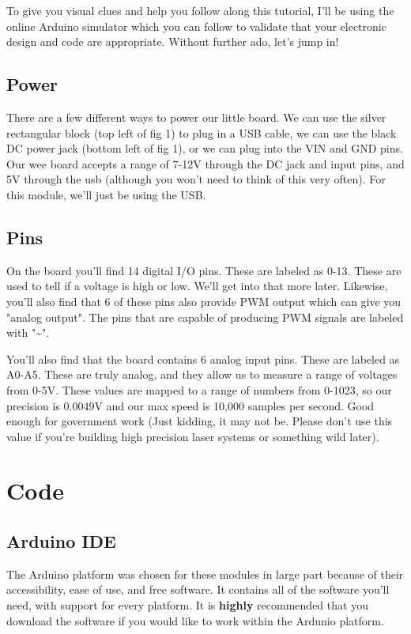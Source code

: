 \documentclass[a4paper]{article}
\begin{document}
To give you visual clues and help you follow along this tutorial, I'll be using the online Arduino simulator \cite{tinkercad} which you can follow to validate that your electronic design and code are appropriate. Without further ado, let's jump in!

\subsection{Power}
There are a few different ways to power our little board. We can use the silver rectangular block (top left of fig 1) to plug in a USB cable, we can use the black DC power jack (bottom left of fig 1), or we can plug into the VIN and GND pins. Our wee board accepts a range of 7-12V through the DC jack and input pins, and 5V through the usb (although you won't need to think of this very often). For this module, we'll just be using the USB.

\subsection{Pins}
On the board you'll find 14 digital I/O \cite{gpio} pins. These are labeled as 0-13. These are used to tell if a voltage is high or low. We'll get into that more later. Likewise, you'll also find that 6 of these pins also provide PWM \cite{pwm} output which can give you "analog output". The pins that are capable of producing PWM signals are labeled with "\~{}".

You'll also find that the board contains 6 analog input pins. These are labeled as A0-A5. These are truly analog, and they allow us to measure a range of voltages from 0-5V. These values are mapped to a range of numbers from 0-1023, so our precision is 0.0049V and our max speed is 10,000 samples per second. Good enough for government work (Just kidding, it may not be. Please don't use this value if you're building high precision laser systems or something wild later).

\section{Code}
\subsection{Arduino IDE}
The Arduino platform \cite{arduino_software} was chosen for these modules in large part because of their accessibility, ease of use, and free software. It contains all of the software you'll need, with support for every platform. It is \textbf{highly} recommended that you download the software if you would like to work within the Ardunio platform.
\end{document}
